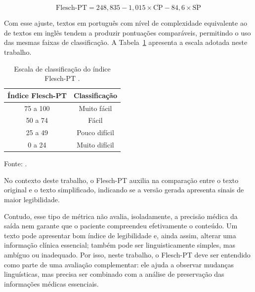 \[
  \text{Flesch-PT} = 248{,}835 - 1{,}015 \times \overline{\text{CP}} - 84{,}6 \times \overline{\text{SP}}
\]

Com esse ajuste, textos em português com nível de complexidade equivalente ao de textos em inglês tendem a produzir pontuações comparáveis, permitindo o uso das mesmas faixas de classificação. A Tabela~\ref{tab:classificacao-flesch-pt} apresenta a escala adotada neste trabalho.

\begin{table}[htbp]
  \centering
  \caption{Escala de classificação do índice Flesch-PT \cite{martins1996readability}.}
  \label{tab:classificacao-flesch-pt}
  \small
  \renewcommand{\arraystretch}{1.15}
  \begin{tabular}{cc}
    \hline
    \textbf{Índice Flesch-PT} & \textbf{Classificação} \\
    \hline
    75 a 100 & Muito fácil \\
    50 a 74  & Fácil \\
    25 a 49  & Pouco difícil \\
    0 a 24   & Muito difícil \\
    \hline
  \end{tabular}

  {\footnotesize Fonte: .}
\end{table}

No contexto deste trabalho, o Flesch-PT auxilia na comparação entre o texto original e o texto simplificado, indicando se a versão gerada apresenta sinais de maior legibilidade.

Contudo, esse tipo de métrica não avalia, isoladamente, a precisão médica da saída nem garante que o paciente compreendeu efetivamente o conteúdo. Um texto pode apresentar bom índice de legibilidade e, ainda assim, alterar uma informação clínica essencial; também pode ser linguisticamente simples, mas ambíguo ou inadequado. Por isso, neste trabalho, o Flesch-PT deve ser entendido como parte de uma avaliação complementar: ele ajuda a observar mudanças linguísticas, mas precisa ser combinado com a análise de preservação das informações médicas essenciais.